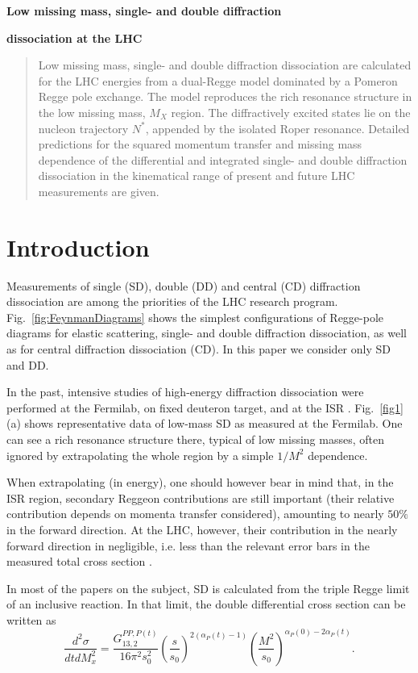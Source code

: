 \documentclass[12pt]{article}
\begin{document}
\vskip 0.5cm \centerline{\bf\Large Low missing mass, single- and double diffraction }
\centerline{\bf\Large dissociation at the LHC}  \vskip 0.3cm
\vskip 1cm

\begin{abstract}
Low missing mass, single- and double diffraction dissociation are calculated for the LHC energies from a dual-Regge model dominated by a Pomeron Regge pole ex\-change. The model reproduces the rich resonance structure in the low missing mass, $M_X$ region. The diffractively excited states lie on the nucleon trajectory $N^*$, appended by the isolated Roper resonance. Detailed predictions for the squared momentum transfer and missing mass dependence of the differential and integrated single- and double diffraction dissociation in the kinematical range of present and future LHC measurements are given.
\end{abstract}

\section{Introduction}
Measurements of single (SD), double (DD) and central (CD) diffraction dissociation are among the priorities of the LHC research program.
Fig.~\ref{fig:FeynmanDiagrams} shows the simplest configurations of Regge-pole diagrams for elastic scattering, single- and double diffraction dissociation, as well as for central diffraction dissociation (CD). In this paper we consider only SD and DD.

In the past, intensive studies of high-energy diffraction dissociation were performed at the Fermilab,
on fixed deuteron target, and at the ISR \cite{Goulianos}. Fig.~\ref{fig1}(a)
shows representative data of low-mass SD as measured at the Fermilab.
One can see a rich resonance structure there, typical of low missing masses, often ignored by extrapolating the whole region by a simple $1/M^2$ dependence.

When extrapolating (in energy), one should however bear in mind that, in the ISR region, secondary Reggeon contributions are still important (their relative contribution depends on momenta transfer considered), amounting to nearly $50\%$ in the forward direction. At the LHC, however, their contribution in the nearly forward direction in negligible, i.e. less than the relevant error bars in the measured total cross section \cite{JLL}.
 
 In most of the papers on the subject, SD is calculated from the triple Regge limit of an inclusive reaction. %
In that limit, the double differential cross section can be written as \cite{Collins, Goulianos}
\begin{equation}
\frac{d^2\sigma}{dtdM^2_x}=
\frac{G^{PP, P(t)}_{1 3, 2}}{16\pi^2s_0^2}\left(\frac{s}{s_0}\right)^{2(\alpha_P(t)-1)}\left(\frac{M^2}{s_0}\right)^{\alpha_P(0)-2\alpha_P(t)}.
\end{equation}
\end{document}
